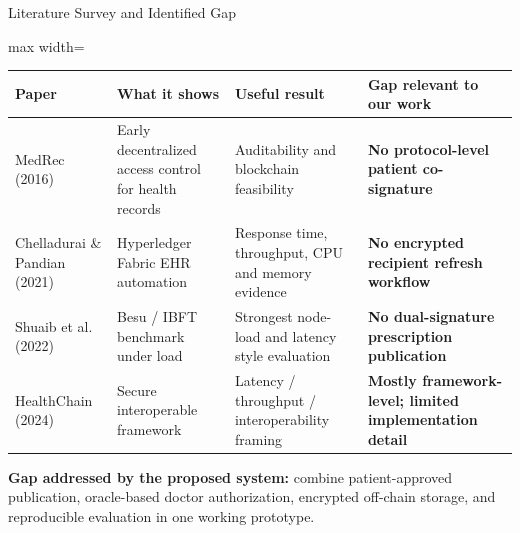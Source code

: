 \documentclass[10pt]{beamer}
\begin{document}
\begin{frame}{Literature Survey and Identified Gap}
\footnotesize
\begin{adjustbox}{max width=\textwidth}
\begin{tabular}{@{}p{3.1cm}p{4.2cm}p{4.4cm}p{3.3cm}@{}}
\toprule
\textbf{Paper} & \textbf{What it shows} & \textbf{Useful result} & \textbf{\textcolor{red!70!black}{Gap relevant to our work}} \\
\midrule
MedRec (2016) & Early decentralized access control for health records & Auditability and blockchain feasibility & \textbf{\textcolor{red!70!black}{No protocol-level patient co-signature}} \\
\midrule
Chelladurai \& Pandian (2021) & Hyperledger Fabric EHR automation & Response time, throughput, CPU and memory evidence & \textbf{\textcolor{red!70!black}{No encrypted recipient refresh workflow}} \\
\midrule
Shuaib et al. (2022) & Besu / IBFT benchmark under load & Strongest node-load and latency style evaluation & \textbf{\textcolor{red!70!black}{No dual-signature prescription publication}} \\
\midrule
HealthChain (2024) & Secure interoperable framework & Latency / throughput / interoperability framing & \textbf{\textcolor{red!70!black}{Mostly framework-level; limited implementation detail}} \\
\bottomrule
\end{tabular}
\end{adjustbox}

\vspace{0.3cm}
\small
\textbf{Gap addressed by the proposed system:} combine patient-approved publication, oracle-based doctor authorization, encrypted off-chain storage, and reproducible evaluation in one working prototype.
\end{frame}
\end{document}
